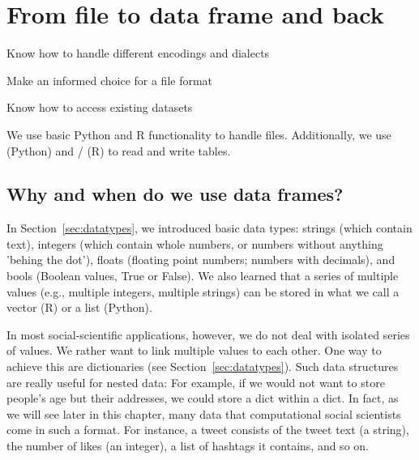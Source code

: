 \chapter{From file to data frame and back}
\label{chap:filetodata}


\begin{abstract}{Abstract}
  This chapter teaches you basics of file handling, such as different file formats and encodings. It introduces csv files, json files, plain text files, and binary file formats. We discuss different approaches to organizing data in files, and how to use dataframes to read from and write to these files.  Finally, we provide guidance for retrieving example datasets.
\end{abstract}


\begin{objectives}
\item Know how to handle different encodings and dialects
\item Make an informed choice for a file format
\item Know how to access existing datasets
\end{objectives}

\begin{feature}
We use basic Python and R functionality to handle files. Additionally, we use  (Python) and / (R) to read and write tables.
\end{feature}


\section{Why and when do we use data frames?}

In Section~\ref{sec:datatypes}, we introduced basic data types: strings (which contain text), integers (which contain whole numbers, or numbers without anything 'behing the dot'), floats (floating point numbers; numbers with decimals), and bools (Boolean values, True or False). 
We also learned that a series of multiple values (e.g., multiple integers, multiple strings) can be stored in what we call a vector (R) or a list (Python).

In most social-scientific applications, however, we do not deal with isolated series of values. We rather want to link multiple values to each other. One way to achieve this are dictionaries (see Section~\ref{sec:datatypes}).
Such data structures are really useful for nested data: For example, if we would not want to store people's age but their addresses, we could store a dict within a dict.
In fact, as we will see later in this chapter, many data that computational social scientists come in such a format. For instance, a tweet consists of the tweet text (a string), the number of likes (an integer), a list of hashtags it contains, and so on.

